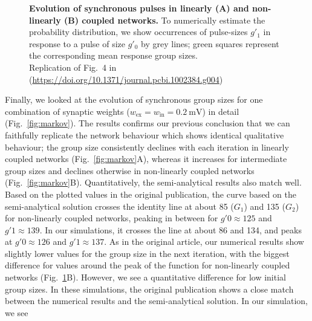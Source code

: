 \documentclass[10pt,a4paper,onecolumn]{article}
\begin{document}
\begin{figure}
\begin{subfigure}[t]{0.5\textwidth}
\end{subfigure}
\caption{\label{fig:markov_corrected}
\textbf{Evolution of synchronous pulses in linearly (A) and non-linearly (B) coupled networks.} To numerically estimate the probability distribution, we show occurrences of pulse-sizes $g'_1$ in response to a pulse of size $g'_0$ by grey lines; green squares represent the corresponding mean response group sizes.\\
Replication of Fig.~4 in \cite{Memmesheimer2012} (\url{https://doi.org/10.1371/journal.pcbi.1002384.g004})}
\end{figure}

Finally, we looked at the evolution of synchronous group sizes for one combination of synaptic weights ($w_\text{ex}=w_\text{in}=\SI{0.2}{\milli\volt}$) in detail (Fig.~\ref{fig:markov}). The results confirms our previous conclusion that we can faithfully replicate the network behaviour which shows identical qualitative behaviour; the group size consistently declines with each iteration in linearly coupled networks (Fig.~\ref{fig:markov}A), whereas it increases for intermediate group sizes and declines otherwise in non-linearly coupled networks (Fig.~\ref{fig:markov}B). Quantitatively, the semi-analytical results also match well. Based on the plotted values in the original publication, the curve based on the semi-analytical solution crosses the identity line at about 85 ($G_1$) and 135 ($G_2$) for non-linearly coupled networks, peaking in between for $g'0\approx125$ and $g'1\approx139$. In our simulations, it crosses the line at about 86 and 134, and peaks at $g'0\approx126$ and $g'1\approx137$. As in the original article, our numerical results show slightly lower values for the group size in the next iteration, with the biggest difference for values around the peak of the function for non-linearly coupled networks (Fig.~\ref{fig:markov_corrected}B). However, we see a quantitative difference for low initial group sizes. In these simulations, the original publication shows a close match between the numerical results and the semi-analytical solution. In our simulation, we see %
\end{document}
